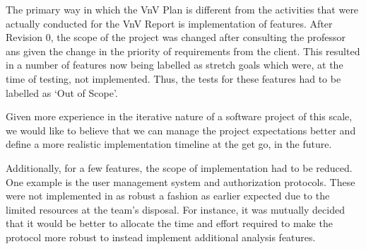 \documentclass[12pt, titlepage]{article}
\begin{document}
\begin{enumerate}
  The primary way in which the VnV Plan is different from the activities that
  were actually conducted for the VnV Report is implementation of features.
  After Revision 0, the scope of the project was changed after consulting the
  professor ans given the change in the priority of requirements from the
  client. This resulted in a number of features now being labelled as stretch
  goals which were, at the time of testing, not implemented. Thus, the tests for
  these features had to be labelled as `Out of Scope'.

  Given more experience in the iterative nature of a software project of this
  scale, we would like to believe that we can manage the project expectations
  better and define a more realistic implementation timeline at the get go, in
  the future.

  Additionally, for a few features, the scope of implementation had to be
  reduced. One example is the user management system and authorization
  protocols. These were not implemented in as robust a fashion as earlier
  expected due to the limited resources at the team's disposal. For instance, it
  was mutually decided that it would be better to allocate the time and effort
  required to make the protocol more robust to instead implement additional
  analysis features.
\end{enumerate}
\end{document}
